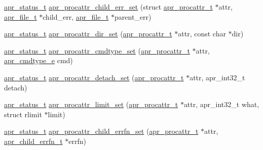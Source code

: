 \begin{DoxyCompactItemize}
\hyperlink{group__apr__errno_gaf76ee4543247e9fb3f3546203e590a6c}{apr\+\_\+status\+\_\+t} \hyperlink{group__apr__thread__proc_ga6fad364c6c820e37c0915435cfb3921f}{apr\+\_\+procattr\+\_\+child\+\_\+err\+\_\+set} (struct \hyperlink{group__apr__thread__proc_ga0d83919a6a0dd609598a864917f8b339}{apr\+\_\+procattr\+\_\+t} $\ast$attr, \hyperlink{group__apr__file__io_gaa46e4763ac375ea3c7a43ba6f6099e22}{apr\+\_\+file\+\_\+t} $\ast$child\+\_\+err, \hyperlink{group__apr__file__io_gaa46e4763ac375ea3c7a43ba6f6099e22}{apr\+\_\+file\+\_\+t} $\ast$parent\+\_\+err)
\item 
\hyperlink{group__apr__errno_gaf76ee4543247e9fb3f3546203e590a6c}{apr\+\_\+status\+\_\+t} \hyperlink{group__apr__thread__proc_ga97766f50b0ae083a2f8a28e698a59baa}{apr\+\_\+procattr\+\_\+dir\+\_\+set} (\hyperlink{group__apr__thread__proc_ga0d83919a6a0dd609598a864917f8b339}{apr\+\_\+procattr\+\_\+t} $\ast$attr, const char $\ast$dir)
\item 
\hyperlink{group__apr__errno_gaf76ee4543247e9fb3f3546203e590a6c}{apr\+\_\+status\+\_\+t} \hyperlink{group__apr__thread__proc_ga1426acc5bdd96385769e7b42bfa6ebbd}{apr\+\_\+procattr\+\_\+cmdtype\+\_\+set} (\hyperlink{group__apr__thread__proc_ga0d83919a6a0dd609598a864917f8b339}{apr\+\_\+procattr\+\_\+t} $\ast$attr, \hyperlink{group__apr__thread__proc_gadcb981d7748c580eb69ac11dbf709060}{apr\+\_\+cmdtype\+\_\+e} cmd)
\item 
\hyperlink{group__apr__errno_gaf76ee4543247e9fb3f3546203e590a6c}{apr\+\_\+status\+\_\+t} \hyperlink{group__apr__thread__proc_ga3ccca55041f648f00f0605673d4e0fdc}{apr\+\_\+procattr\+\_\+detach\+\_\+set} (\hyperlink{group__apr__thread__proc_ga0d83919a6a0dd609598a864917f8b339}{apr\+\_\+procattr\+\_\+t} $\ast$attr, apr\+\_\+int32\+\_\+t detach)
\item 
\hyperlink{group__apr__errno_gaf76ee4543247e9fb3f3546203e590a6c}{apr\+\_\+status\+\_\+t} \hyperlink{group__apr__thread__proc_ga4de85cfd54d27476dbb943955c1b0a2a}{apr\+\_\+procattr\+\_\+limit\+\_\+set} (\hyperlink{group__apr__thread__proc_ga0d83919a6a0dd609598a864917f8b339}{apr\+\_\+procattr\+\_\+t} $\ast$attr, apr\+\_\+int32\+\_\+t what, struct rlimit $\ast$limit)
\item 
\hyperlink{group__apr__errno_gaf76ee4543247e9fb3f3546203e590a6c}{apr\+\_\+status\+\_\+t} \hyperlink{group__apr__thread__proc_gaa39deba0837e0772754ad41589b733cf}{apr\+\_\+procattr\+\_\+child\+\_\+errfn\+\_\+set} (\hyperlink{group__apr__thread__proc_ga0d83919a6a0dd609598a864917f8b339}{apr\+\_\+procattr\+\_\+t} $\ast$attr, \hyperlink{group__apr__thread__proc_ga428aa21a05476068f95d9ee30d1b420a}{apr\+\_\+child\+\_\+errfn\+\_\+t} $\ast$errfn)

\end{DoxyCompactItemize}
